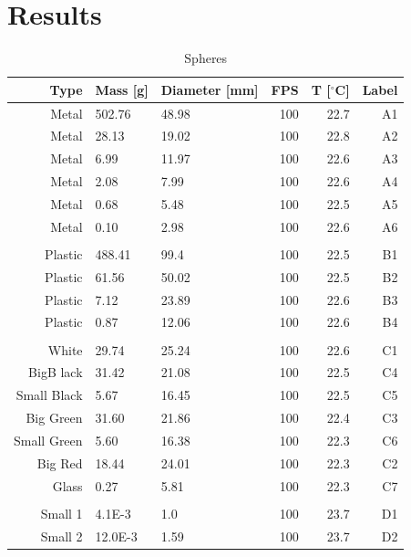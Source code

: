 \documentclass[11pt,a4paper]{article}
\begin{document}
\section{\label{sect:results}Results}

  \begin{table}[H]
    \center
    \begin{tabular}{ r | l  l  r  r  r }
      
      Type       & Mass [g] & Diameter [mm]   & FPS    & T [$^\circ$C]   & Label \\ 
      \hline
      Metal       & 502.76  & 48.98          & 100    & 22.7   & A1  \\ 
      Metal       & 28.13   & 19.02          & 100    & 22.8   & A2  \\  
      Metal       & 6.99    & 11.97          & 100    & 22.6   & A3  \\ 
      Metal       & 2.08    & 7.99           & 100    & 22.6   & A4  \\ 
      Metal       & 0.68    & 5.48           & 100    & 22.5   & A5  \\ 
      Metal       & 0.10    & 2.98           & 100    & 22.6   & A6  \\ 
      \\
      Plastic     & 488.41  & 99.4           & 100    & 22.5   & B1  \\ 
      Plastic     & 61.56   & 50.02          & 100    & 22.5   & B2  \\ 
      Plastic     & 7.12    & 23.89          & 100    & 22.6   & B3  \\ 
      Plastic     & 0.87    & 12.06          & 100    & 22.6   & B4  \\ 
      \\
      White       & 29.74   & 25.24          & 100    & 22.6   & C1  \\ 
      BigB lack   & 31.42   & 21.08          & 100    & 22.5   & C4  \\ 
      Small Black & 5.67    & 16.45          & 100    & 22.5   & C5  \\ 
      Big Green   & 31.60   & 21.86          & 100    & 22.4   & C3  \\ 
      Small Green & 5.60    & 16.38          & 100    & 22.3   & C6  \\ 
      Big Red     & 18.44   & 24.01          & 100    & 22.3   & C2  \\ 
      Glass       & 0.27    & 5.81           & 100    & 22.3   & C7  \\ 
      \\
      Small 1     & 4.1E-3  & 1.0            & 100    & 23.7   & D1  \\ 
      Small 2     & 12.0E-3 & 1.59           & 100    & 23.7   & D2  \\    
    \end{tabular}
    \caption{Spheres}
  \end{table}
\end{document}
